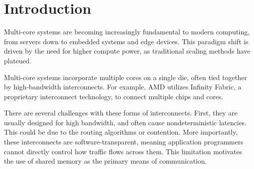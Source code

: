 \section{Introduction}
\label{sec:introduction}





  Multi-core systems are becoming increasingly fundamental to modern computing, from servers down to embedded systems and edge devices. This paradigm shift is driven by the need for higher compute power, as traditional scaling methods have plateued. 

  Multi-core systems incorporate multiple cores on a single die, often tied together by high-bandwidth interconnects. For example, AMD utilizes Infinity Fabric, a proprietary interconnect technology, to connect multiple chips and cores.

  There are several challenges with these forms of interconnects. First, they are usually designed for high bandwidth, and often cause nondeterministic latencies. This could be due to the routing algorithms or contention. More importantly, these interconnects are software-transparent, meaning application programmers cannot directly control how traffic flows across them. 
  This limitation motivates the use of shared memory as the primary means of communication.

